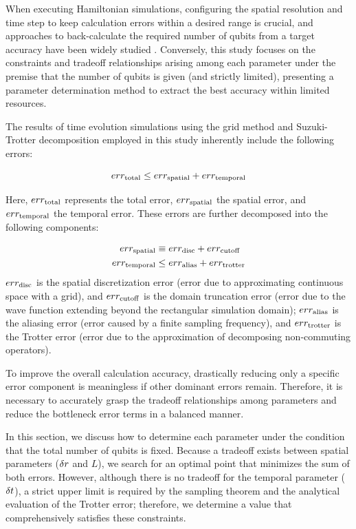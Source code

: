 \documentclass[jctc-draft.tex]{subfiles}
\begin{document}
When executing Hamiltonian simulations, configuring the spatial resolution and
time step to keep calculation errors within a desired range is crucial, and
approaches to back-calculate the required number of qubits from a target
accuracy have been widely studied \cite{FEIT1982412, Kivlichan_2017,
Chan2023.sciadv.abo7484}. Conversely, this study focuses on the constraints and
tradeoff relationships arising among each parameter under the premise that
the number of qubits is given (and strictly limited), presenting a parameter
determination method to extract the best accuracy within limited resources.

The results of time evolution simulations using the grid method and
Suzuki-Trotter decomposition employed in this study inherently include the
following errors:

\begin{equation}
err_{\mathrm{total}} \leq err_{\mathrm{spatial}} + err_{\mathrm{temporal}}
\label{eq:error-total-decomposition}
\end{equation}

Here, $err_{\mathrm{total}}$ represents the total error, $err_{\mathrm{spatial}}$ the spatial error,
and $err_{\mathrm{temporal}}$ the temporal error. These errors are further decomposed into
the following components:

\begin{align}
    err_{\mathrm{spatial}} &\equiv err_{\mathrm{disc}} + err_{\mathrm{cutoff}} \\
    err_{\mathrm{temporal}} &\leq err_{\mathrm{alias}} + err_{\mathrm{trotter}}
\end{align}
$err_{\mathrm{disc}}$ is the spatial discretization error (error due to approximating
continuous space with a grid), and $err_{\mathrm{cutoff}}$ is the domain truncation error
(error due to the wave function extending beyond the rectangular simulation
domain); $err_{\mathrm{alias}}$ is the aliasing error (error caused by a
finite sampling frequency), and $err_{\mathrm{trotter}}$ is the Trotter error (error due to
the approximation of decomposing non-commuting operators).

To improve the overall calculation accuracy, drastically reducing only a
specific error component is meaningless if other dominant errors remain.
Therefore, it is necessary to accurately grasp the tradeoff relationships among
parameters and reduce the bottleneck error terms in a balanced manner.

In this section, we discuss how to determine each parameter under the condition
that the total number of qubits is fixed. Because a tradeoff exists between
spatial parameters ($\delta r$ and $L$), we search for an optimal point that
minimizes the sum of both errors. However, although there is no tradeoff for the
temporal parameter ($\delta t$), a strict upper limit is required by the sampling
theorem and the analytical evaluation of the Trotter error; therefore, we
determine a value that comprehensively satisfies these constraints.
\end{document}
